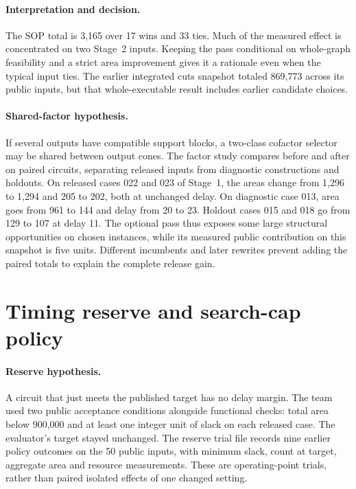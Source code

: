 \paragraph{Interpretation and decision.} The SOP total is 3,165 over 17 wins and 33 ties. Much of the measured effect is concentrated on two Stage~2 inputs. Keeping the pass conditional on whole-graph feasibility and a strict area improvement gives it a rationale even when the typical input ties. The earlier integrated cuts snapshot totaled 869,773 across its public inputs, but that whole-executable result includes earlier candidate choices.

\paragraph{Shared-factor hypothesis.} If several outputs have compatible support blocks, a two-class cofactor selector may be shared between output cones. The factor study compares before and after on paired circuits, separating released inputs from diagnostic constructions and holdouts. On released cases 022 and 023 of Stage~1, the areas change from 1,296 to 1,294 and 205 to 202, both at unchanged delay. On diagnostic case 013, area goes from 961 to 144 and delay from 20 to 23. Holdout cases 015 and 018 go from 129 to 107 at delay 11. The optional pass thus exposes some large structural opportunities on chosen instances, while its measured public contribution on this snapshot is five units. Different incumbents and later rewrites prevent adding the paired totals to explain the complete release gain.

\clearpage
\section*{Timing reserve and search-cap policy}

\paragraph{Reserve hypothesis.} A circuit that just meets the published target has no delay margin. The team used two public acceptance conditions alongside functional checks: total area below 900,000 and at least one integer unit of slack on each released case. The evaluator's target stayed unchanged. The reserve trial file records nine earlier policy outcomes on the 50 public inputs, with minimum slack, count at target, aggregate area and resource measurements. These are operating-point trials, rather than paired isolated effects of one changed setting.

